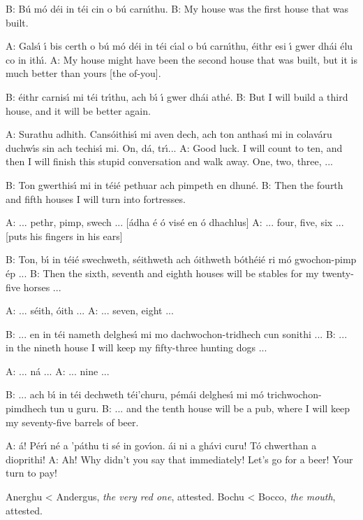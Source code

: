 B: B\'{u} m\'{o} d\'{e}i in t\'{e}i cin o b\'{u} carn\'{\i}thu.
B: My house was the first house that was built.

A: Gals\'{\i} \'{\i} bis certh o b\'{u} m\'{o} d\'{e}i in t\'{e}i c\'{\i}al o b\'{u} carn\'{\i}thu, \'{e}ithr esi \'{\i} gwer dh\'{a}i \'{e}lu co in ith\'{\i}.
A: My house might have been the second house that was built, but it is much better than yours [the of-you].

B: \'{e}ithr carnis\'{\i} mi t\'{e}i tr\'{\i}thu, ach b\'{\i} \'{\i} gwer dh\'{a}i ath\'{e}.
B: But I will build a third house, and it will be better again.

A: Surathu adhith. Cans\'{o}ithis\'{\i} mi aven dech, ach ton anthas\'{\i} mi in colav\'{a}ru duchw\'{\i}s sin ach techis\'{\i} mi. On, d\'{a}, tr\'{\i}... 
A: Good luck. I will count to ten, and then I will finish this stupid conversation and walk away. One, two, three, ... 

B: Ton gwerthis\'{\i} mi in t\'{e}i\'{e} pethuar ach pimpeth en dhun\'{e}.
B: Then the fourth and fifth houses I will turn into fortresses.

A: ... pethr, pimp, swech ... [\'{a}dha \'{e} \'{o} vis\'{e} en \'{o} dhachlus]
A: ... four, five, six ... [puts his fingers in his ears]

B: Ton, b\'{\i} in t\'{e}i\'{e} swechweth, s\'{e}ithweth ach \'{o}ithweth b\'{o}th\'{e}i\'{e} ri m\'{o} gwochon-pimp \'{e}p ... 
B: Then the sixth, seventh and eighth houses will be stables for my twenty-five horses ...

A: ... s\'{e}ith, \'{o}ith ...
A: ... seven, eight ...

B: ... en in t\'{e}i nameth delghes\'{\i} mi mo dachwochon-tridhech cun sonithi ...
B: ... in the nineth house I will keep my fifty-three hunting dogs ...

A: ... n\'{a} ...
A: ... nine ...

B: ... ach b\'{\i} in t\'{e}i dechweth t\'{e}i'churu, p\'{e}m\'{a}i delghes\'{\i} mi m\'{o} trichwochon-pimdhech tun u guru.
B: ... and the tenth house will be a pub, where I will keep my seventy-five barrels of beer.

A: \'{a}! P\'{e}r\'{\i} n\'{e} a 'p\'{a}thu ti s\'{e} in gov\'{\i}on. \'{a}i ni a gh\'{a}vi curu! T\'{o} chwerthan a dioprithi!
A: Ah! Why didn't you say that immediately! Let's go for a beer! Your turn to pay!

Anerghu < Andergus, \textit{the very red one}, attested.
Bochu < Bocco, \textit{the mouth}, attested.

